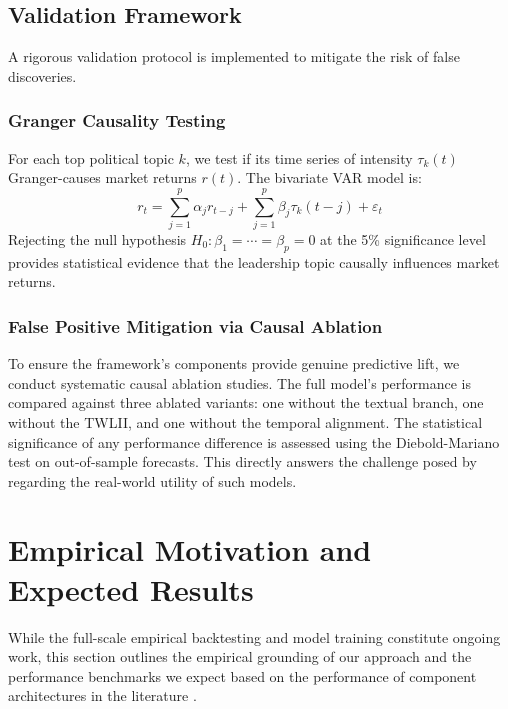 \documentclass[11pt]{article}
\begin{document}
\subsection{Validation Framework}
A rigorous validation protocol is implemented to mitigate the risk of false discoveries.

\subsubsection{Granger Causality Testing}
For each top political topic $k$, we test if its time series of intensity $\tau_k(t)$ Granger-causes market returns $r(t)$. The bivariate VAR model is:
\begin{equation}
r_t = \sum_{j=1}^{p} \alpha_j r_{t-j} + \sum_{j=1}^{p} \beta_j \tau_k(t-j) + \varepsilon_t
\label{eq:granger}
\end{equation}
Rejecting the null hypothesis $H_0: \beta_1 = \cdots = \beta_p = 0$ at the 5\% significance level provides statistical evidence that the leadership topic causally influences market returns.

\subsubsection{False Positive Mitigation via Causal Ablation}
To ensure the framework's components provide genuine predictive lift, we conduct systematic causal ablation studies. The full model's performance is compared against three ablated variants: one without the textual branch, one without the TWLII, and one without the temporal alignment. The statistical significance of any performance difference is assessed using the Diebold-Mariano test on out-of-sample forecasts. This directly answers the challenge posed by \cite{nazari2025} regarding the real-world utility of such models.

\section{Empirical Motivation and Expected Results}
\label{sec:results}

While the full-scale empirical backtesting and model training constitute ongoing work, this section outlines the empirical grounding of our approach and the performance benchmarks we expect based on the performance of component architectures in the literature \cite{bhandari2025, rahul2025, paul2024, seng2023}.
\end{document}
